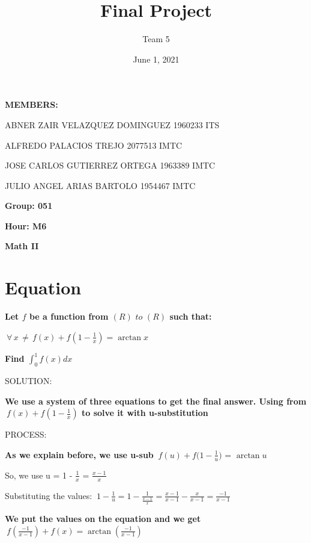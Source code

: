 \documentclass{article}
\title{Final Project}
\author{Team 5}
\date{June 1, 2021}
\begin{document}
\maketitle
\begin{center}{}{}
       \item \textbf{MEMBERS:}
\end{center}
\begin{list}
        \bigskip\item ABNER ZAIR VELAZQUEZ DOMINGUEZ 1960233 ITS
        \bigskip\item ALFREDO PALACIOS TREJO 2077513 IMTC
        \bigskip\item JOSE CARLOS GUTIERREZ ORTEGA 1963389 IMTC
        \bigskip\item JULIO ANGEL ARIAS BARTOLO 1954467 IMTC
\end{list}
\begin{center}
       \bigskip\item \textbf{Group: 051}
       \bigskip\item \textbf{Hour: M6} 
       \bigskip\item \textbf{Math II}
\end{center}
\newpage
\section{Equation}

\textbf{Let $f$ be a function from $ (R)\,\,to\,\,(R) $ such that:}
\begin{center}
\bigskip $\  \forall\,x\,\neq\, f(x) + f(1-\frac{1}{x})=\arctan{x} $\ 
\end{center}
\bigskip \textbf{ Find  $\int_{0}^1 f(x)dx $\ }

\bigskip SOLUTION:

\bigskip \textbf{We use a system of three equations to get the final answer. Using from $\ f(x) + f(1-\frac{1}{x})$ to solve it with u-substitution}

\bigskip PROCESS:

\bigskip \textbf{As we explain before, we use u-sub} $\ f(u) + f({1-\frac{1}{u})}$ = $\arctan{u} $\ 

\bigskip So, we use u = 1 - $\frac{1}{x}$ = $\frac{x-1}{x} $\

\bigskip Substituting the values: $\ 1-\frac{1}{u}= 1-\frac{1}{\frac{x-1}{x}}=\frac{x-1}{x-1}-\frac{x}{x-1}=\frac{-1}{x-1} $

\bigskip\textbf{We put the values on the equation and we get $\ f(\frac{-1}{x-1})+f(x)=\arctan(\frac{-1}{x-1}) $\  }
\end{document}
